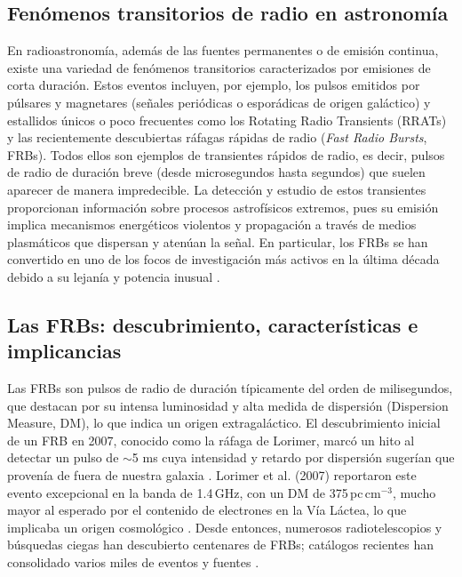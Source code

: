 
\subsection{Fenómenos transitorios de radio en astronomía}

En radioastronomía, además de las fuentes permanentes o de 
emisión continua, existe una variedad de fenómenos transitorios 
caracterizados por emisiones de corta duración. Estos eventos incluyen, 
por ejemplo, los pulsos emitidos por púlsares y magnetares (señales periódicas o esporádicas de
origen galáctico) y estallidos únicos o poco frecuentes como los Rotating Radio Transients 
(RRATs) y las recientemente descubiertas ráfagas rápidas de radio (\textit{Fast Radio Bursts}, FRBs). 
Todos ellos son ejemplos de transientes rápidos de radio, es decir, pulsos de radio de duración breve 
(desde microsegundos hasta segundos) que suelen aparecer de manera impredecible. La detección y estudio
de estos transientes proporcionan información sobre procesos astrofísicos extremos, pues su emisión 
implica mecanismos energéticos violentos y propagación a través de medios plasmáticos que dispersan 
y atenúan la señal. En particular, los FRBs se han convertido en uno de los focos de investigación 
más activos en la última década debido a su lejanía y potencia inusual \citep{Petroff_2022}.

\subsection{Las FRBs: descubrimiento, características e implicancias}

Las FRBs son pulsos de radio de duración típicamente del orden de milisegundos, 
que destacan por su intensa luminosidad y alta medida de dispersión (Dispersion Measure, DM), lo que 
indica un origen extragaláctico. El descubrimiento inicial de un FRB en 2007, conocido como la ráfaga 
de Lorimer, marcó un hito al detectar un pulso de $\sim$5 ms cuya intensidad y retardo por dispersión 
sugerían que provenía de fuera de nuestra galaxia \citep{Lorimer2007}. Lorimer et al. (2007) reportaron 
este evento excepcional en la banda de 1.4\,GHz, con un DM de 375\,pc\,cm$^{-3}$, mucho mayor al esperado
 por el contenido de electrones en la Vía Láctea, lo que implicaba un origen cosmológico 
 \citep{Lorimer2007,CordesMcLaughlin2003}. Desde entonces, numerosos radiotelescopios y 
 búsquedas ciegas han descubierto centenares de FRBs; catálogos recientes han consolidado 
 varios miles de eventos y fuentes \citep{CHIME2021,CHIMEFRB_2021_Catalog1,Petroff2019}.

